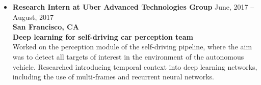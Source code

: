 \documentclass[10pt,letterpaper]{article}
\newcommand{\thing}[2]{{#1} \hfill {#2}}
\begin{document}
\begin{itemize}
\item \thing{\bf Research Intern at Uber Advanced Technologies Group}{June, 2017 -- August, 2017}\\
        {\bf San Francisco, CA} \\
        {\bf Deep learning for self-driving car perception team}\vspace{0.5em}\\
        Worked on the perception module of the self-driving pipeline, where the aim was to detect all targets of interest in the environment of the autonomous vehicle. Researched introducing temporal context into deep learning networks, including the use of multi-frames and recurrent neural networks.
	

\end{itemize}


\vspace{-1.5em}
\end{document}
